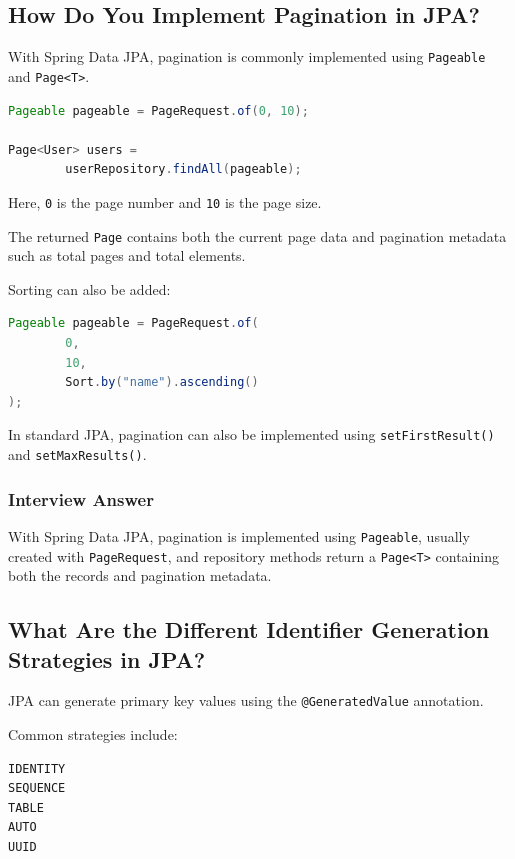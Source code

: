 \documentclass[12pt,a4paper]{article}
\begin{document}
\subsection{How Do You Implement Pagination in JPA?}

With Spring Data JPA, pagination is commonly implemented using
\texttt{Pageable} and \texttt{Page<T>}.

\begin{lstlisting}[language=Java]
Pageable pageable = PageRequest.of(0, 10);

Page<User> users =
        userRepository.findAll(pageable);
\end{lstlisting}

Here, \texttt{0} is the page number and \texttt{10} is the page size.

The returned \texttt{Page} contains both the current page data and
pagination metadata such as total pages and total elements.

Sorting can also be added:

\begin{lstlisting}[language=Java]
Pageable pageable = PageRequest.of(
        0,
        10,
        Sort.by("name").ascending()
);
\end{lstlisting}

In standard JPA, pagination can also be implemented using
\texttt{setFirstResult()} and \texttt{setMaxResults()}.

\subsubsection*{Interview Answer}

With Spring Data JPA, pagination is implemented using \texttt{Pageable},
usually created with \texttt{PageRequest}, and repository methods return a
\texttt{Page<T>} containing both the records and pagination metadata.

\subsection{What Are the Different Identifier Generation Strategies in JPA?}

JPA can generate primary key values using the
\texttt{@GeneratedValue} annotation.

Common strategies include:

\begin{verbatim}
IDENTITY
SEQUENCE
TABLE
AUTO
UUID
\end{verbatim}
\end{document}

